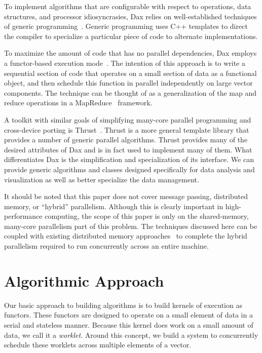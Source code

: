 \documentclass[conference]{IEEEtran}
\newcommand*{\lcite}[1]{~\cite{#1}}
\newcommand*{\keyterm}[1]{\emph{#1}}
\begin{document}
\noindent
To implement algorithms that are configurable with respect to operations,
data structures, and processor idiosyncrasies, Dax relies on
well-established techniques of generic programming\lcite{Musser1996}.
Generic programming uses C++ templates to direct the compiler to specialize
a particular piece of code to alternate implementations.

To maximize the amount of code that has no parallel dependencies, Dax
employs a functor-based execution mode\lcite{Baker2010}.  The intention of
this approach is to write a sequential section of code that operates on a
small section of data as a functional object, and then schedule this
function in parallel independently on large vector components.  The
technique can be thought of as a generalization of the map and reduce
operations in a MapReduce\lcite{MapReduce} framework.

A toolkit with similar goals of simplifying many-core parallel programming
and cross-device porting is Thrust\lcite{Thrust}.  Thrust is a more general
template library that provides a number of generic parallel algorithms.
Thrust provides many of the desired attributes of Dax and is in fact used
to implement many of them.  What differentiates Dax is the simplification
and specialization of its interface.  We can provide generic algorithms and
classes designed specifically for data analysis and visualization as well
as better specialize the data management.

It should be noted that this paper does not cover message passing,
distributed memory, or ``hybrid'' parallelism.  Although this is clearly
important in high-performance computing, the scope of this paper is only on
the shared-memory, many-core parallelism part of this problem.  The
techniques discussed here can be coupled with existing distributed memory
approaches\lcite{Ahrens2000,Peterka2011} to complete the hybrid parallelism
required to run concurrently across an entire machine.

\section{Algorithmic Approach}
\label{sec:AlgorithmicApproach}

\noindent
Our basic approach to building algorithms is to build kernels of execution
as functors.  These functors are designed to operate on a small element of
data in a serial and stateless manner.  Because this kernel does work on a
small amount of data, we call it a \keyterm{worklet}.  Around this concept,
we build a system to concurrently schedule these worklets across multiple
elements of a vector.
\end{document}

